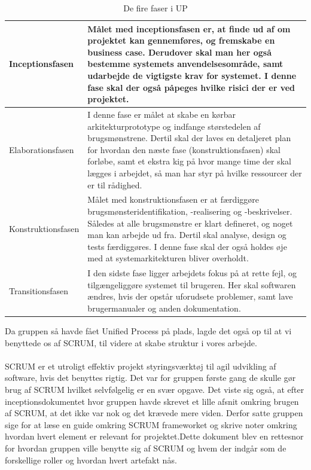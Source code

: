         \begin{table}[H]
        \centering
        \begin{tabular}{|p{35mm}|p{105mm}|}
        \hline
            Inceptionsfasen & Målet med inceptionsfasen er, at finde ud af om projektet kan gennemføres, og fremskabe en business case. Derudover skal man her også bestemme systemets anvendelsesområde, samt udarbejde de vigtigste krav for systemet. I denne fase skal der også påpeges hvilke risici der er ved projektet.
        \\ \hline
            Elaborationsfasen & I denne fase er målet at skabe en kørbar arkitekturprototype og indfange størstedelen af brugsmønstrene. Dertil skal der laves en detaljeret plan for hvordan den næste fase (konstruktionsfasen) skal forløbe, samt et ekstra kig på hvor mange time der skal lægges i arbejdet, så man har styr på hvilke ressourcer der er til rådighed.
        \\ \hline
            Konstruktionsfasen & Målet med konstruktionsfasen er at færdiggøre brugsmønsteridentifikation, -realisering og -beskrivelser. Således at alle brugsmønstre er klart defineret, og noget man kan arbejde ud fra. Dertil skal analyse, design og tests færdiggøres. I denne fase skal der også holdes øje med at systemarkitekturen bliver overholdt.
        \\ \hline
            Transitionsfasen & I den sidste fase ligger arbejdets fokus på at rette fejl, og tilgængeliggøre systemet til brugeren. Her skal softwaren ændres, hvis der opstår uforudsete problemer, samt lave brugermanualer og anden dokumentation.
        \\ \hline
        \end{tabular}
            \caption{De fire faser i UP}
            \label{tab:UP_faser}
        \end{table}
Da gruppen så havde fået Unified Process på plads, lagde det også op til at vi benyttede os af SCRUM, til videre at skabe struktur i vores arbejde. %
\\\\
SCRUM er et utroligt effektiv projekt styringsværktøj til agil udvikling af software, hvis det benyttes rigtig. Det var for gruppen første gang de skulle gør brug af SCRUM hvilket selvfølgelig er en svær opgave. Det viste sig også, at efter inceptionsdokumentet hvor gruppen havde skrevet et lille afsnit omkring brugen af SCRUM, at det ikke var nok og det krævede mere viden. Derfor satte gruppen sige for at læse en guide omkring SCRUM frameworket og skrive noter omkring hvordan hvert element er relevant for projektet.Dette dokument blev en rettesnor for hvordan gruppen ville benytte sig af SCRUM og hvem der indgår som de forskellige roller og hvordan hvert artefakt nås. 
